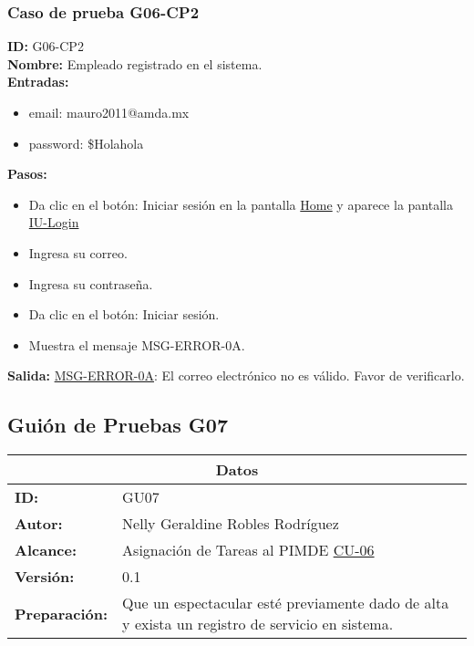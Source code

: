 \subsubsection{Caso de prueba G06-CP2}
\textbf{ID:} G06-CP2\\
\textbf{Nombre:} Empleado registrado en el sistema.\\
\textbf{Entradas:} 
\begin{itemize}
    \item email: mauro2011@amda.mx
    \item password: \$Holahola\\
\end{itemize}
\textbf{Pasos:}
\begin{itemize}
    \item Da clic en el botón: Iniciar sesión en la pantalla \hyperlink{IU:IU-HOME}{Home} y aparece la pantalla \hyperlink{IU:IU-Login}{IU-Login}
    \item Ingresa su correo.
    \item Ingresa su contraseña.
    \item Da clic en el botón: Iniciar sesión.
    \item Muestra el mensaje MSG-ERROR-0A.
\end{itemize}
\textbf{Salida:}
\hyperlink{MSG-ERROR-0A}{MSG-ERROR-0A}: El correo electrónico no es válido. Favor de verificarlo.


\clearpage




\subsection{Guión de Pruebas G07}
\begin{table}[htbp]
\centering
\begin{tabular}{| p{5cm}| p{13cm} |} \hline
\multicolumn{2}{|c|}{\textbf{Datos}} \\ \hline
    \textbf{ID:}&GU07\\ \hline
    \textbf{Autor:}&Nelly Geraldine Robles Rodríguez\\ \hline
    \textbf{Alcance:}&Asignación de Tareas al PIMDE
    \hyperlink{CU:CU-06}{CU-06}\\ \hline
    \textbf{Versión:}&0.1\\ \hline
    \textbf{Preparación:}&Que un espectacular esté previamente dado de alta y exista un registro de servicio  en sistema. \\ \hline
\end{tabular}
\end{table}

